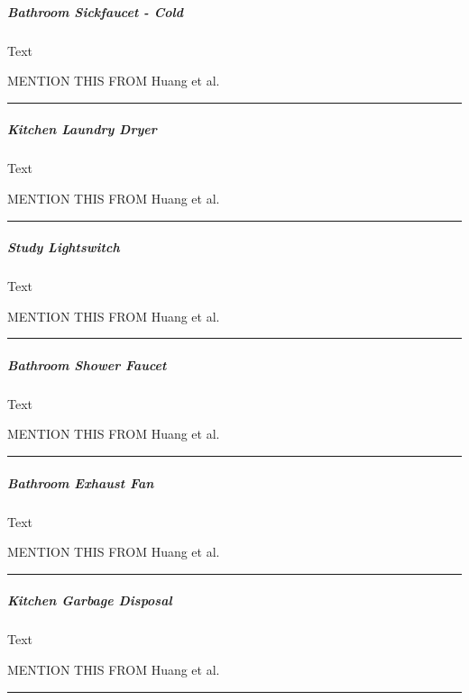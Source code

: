 \documentclass[11pt]{article}
\begin{document}
    \hypertarget{bathroom-sickfaucet---cold}{%
\subparagraph{Bathroom Sickfaucet -
Cold}\label{bathroom-sickfaucet---cold}}

    Text

    MENTION THIS FROM Huang et al.~

\begin{center}\rule{0.5\linewidth}{\linethickness}\end{center}

    \hypertarget{kitchen-laundry-dryer}{%
\subparagraph{Kitchen Laundry Dryer}\label{kitchen-laundry-dryer}}

    Text

    MENTION THIS FROM Huang et al.~

\begin{center}\rule{0.5\linewidth}{\linethickness}\end{center}

    \hypertarget{study-lightswitch}{%
\subparagraph{Study Lightswitch}\label{study-lightswitch}}

    Text

    MENTION THIS FROM Huang et al.~

\begin{center}\rule{0.5\linewidth}{\linethickness}\end{center}

    \hypertarget{bathroom-shower-faucet}{%
\subparagraph{Bathroom Shower Faucet}\label{bathroom-shower-faucet}}

    Text

    MENTION THIS FROM Huang et al.~

\begin{center}\rule{0.5\linewidth}{\linethickness}\end{center}

    \hypertarget{bathroom-exhaust-fan}{%
\subparagraph{Bathroom Exhaust Fan}\label{bathroom-exhaust-fan}}

    Text

    MENTION THIS FROM Huang et al.~

\begin{center}\rule{0.5\linewidth}{\linethickness}\end{center}

    \hypertarget{kitchen-garbage-disposal}{%
\subparagraph{Kitchen Garbage Disposal}\label{kitchen-garbage-disposal}}

    Text

    MENTION THIS FROM Huang et al.~

\begin{center}\rule{0.5\linewidth}{\linethickness}\end{center}
\end{document}
